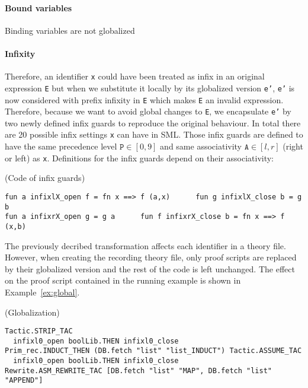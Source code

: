 \documentclass[runningheads,a4paper,draft]{svjour3}
\def\sml{\textsf{SML}\xspace}
\begin{document}
\paragraph{Bound variables}
Binding variables are not globalized



\paragraph{Infixity}
 Therefore, an identifier \texttt{x} could have been treated 
as infix in an original expression \texttt{E} but when 
we substitute it locally by its 
globalized version \texttt{e'}, \texttt{e'} is now considered with prefix 
infixity in \texttt{E} which makes \texttt{E} an invalid expression. Therefore, 
because we 
want to avoid global changes to \texttt{E}, we encapsulate \texttt{e'} by two 
newly 
defined 
infix guards to reproduce 
the original behaviour.
In total there are 20 possible infix settings \texttt{x} can have in \sml.
Those infix guards are defined to have the 
same 
precedence level $\texttt{P}\in[0,9]$ and same associativity 
$\texttt{A}\in[l,r]$ (right or left) as \texttt{x}.
Definitions for the infix guards depend on their associativity: 

\begin{definition}(Code of infix guards)
\begin{lstlisting}[language=SMLSmall,frame=tb]
fun a infixlX_open f = fn x ==> f (a,x)      fun g infixlX_close b = g b
fun a infixrX_open g = g a      fun f infixrX_close b = fn x ==> f (x,b) 
\end{lstlisting}
\end{definition}

The previously decribed transformation affects each identifier in a theory 
file. However, when creating the recording theory file, only proof scripts are 
replaced by their 
globalized version and the rest of the code is left unchanged. The effect on 
the proof script contained in the running example is shown in 
Example~\ref{ex:global}.



\begin{example}\label{ex:global} (Globalization)
\begin{lstlisting}[language=SMLSmall,frame=tb]
Tactic.STRIP_TAC 
  infixl0_open boolLib.THEN infixl0_close
Prim_rec.INDUCT_THEN (DB.fetch "list" "list_INDUCT") Tactic.ASSUME_TAC
  infixl0_open boolLib.THEN infixl0_close
Rewrite.ASM_REWRITE_TAC [DB.fetch "list" "MAP", DB.fetch "list" "APPEND"]
\end{lstlisting}
\end{example} 
\end{document}
